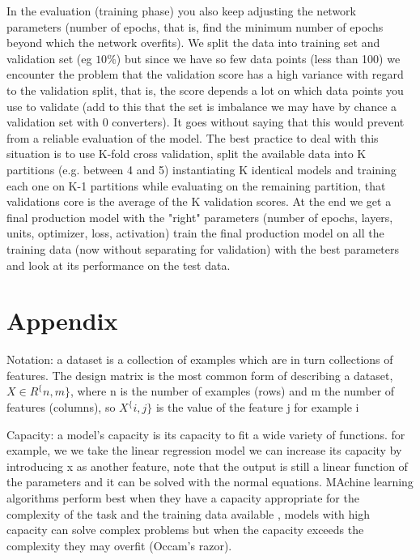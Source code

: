 \documentclass[11pt]{article}
\begin{document}
In the evaluation (training phase) you also keep adjusting the network parameters (number of epochs, that is, find the minimum number of epochs beyond which the network overfits). We split the data into training set and validation set (eg $10\%$) but since we have so few data points (less than 100) we encounter the problem that the validation score has a high variance with regard to the validation split, that is, the score depends a lot on which data points you use to validate (add to this that the set is imbalance we may have by chance a validation set with 0 converters). It goes without saying that this would prevent from a reliable evaluation of the model. 
The best practice to deal with this situation is to use K-fold cross validation, split the available data into K partitions (e.g. between 4 and 5) instantiating K identical models and training each one on K-1 partitions while evaluating on the remaining partition, that validations core is the average of the K validation scores.
At the end we get a final production model with the "right" parameters (number of epochs, layers, units, optimizer, loss, activation) train the final production model on all the training data (now without separating for validation) with the best parameters and look at its performance on the test data.



\section{Appendix}
Notation:  a dataset is a collection of examples which are in turn collections of features. The design matrix is the most common form of describing a dataset, $X \in R^\{n,m\}$, where n is the number of examples (rows) and m the number of features (columns), so $X^\{i,j\}$ is the value of the feature j for example i

Capacity: a model's capacity is its capacity to fit a wide variety of functions. for example, we we take the linear regression model we can increase its capacity by introducing x as another feature, note that the output is still a linear function of the parameters and it can be solved with the normal equations. MAchine learning algorithms perform best when they have a capacity appropriate for the complexity of the task and the training data available , models with high capacity can solve complex problems but when the capacity exceeds the complexity they may overfit (Occam's razor). 
\end{document}
